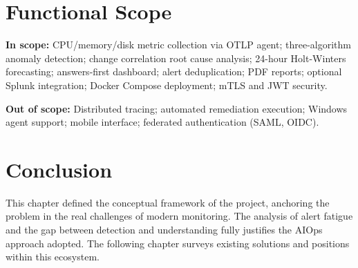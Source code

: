 \section{Functional Scope}

\textbf{In scope:} CPU/memory/disk metric collection via OTLP agent; three-algorithm
anomaly detection; change correlation root cause analysis; 24-hour Holt-Winters
forecasting; answers-first dashboard; alert deduplication; PDF reports;
optional Splunk integration; Docker Compose deployment; mTLS and JWT security.

\textbf{Out of scope:} Distributed tracing; automated remediation execution;
Windows agent support; mobile interface; federated authentication (SAML, OIDC).

\section*{Conclusion}

This chapter defined the conceptual framework of the \caimp{} project, anchoring
the problem in the real challenges of modern monitoring. The analysis of alert
fatigue and the gap between detection and understanding fully justifies the AIOps
approach adopted. The following chapter surveys existing solutions and positions
\caimp{} within this ecosystem.
